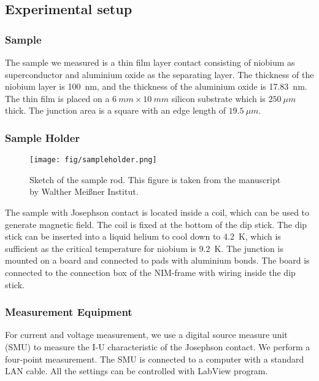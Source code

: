 \subsection{Experimental setup}

\subsubsection{Sample}
The sample we measured is a thin film layer contact consisting of niobium as superconductor and aluminium oxide as the separating layer. The thickness of the niobium layer is \SI{100}{nm}, and the thickness of the aluminium oxide is \SI{17.83}{nm}. The thin film is placed on a $\SI{6}{mm} \times \SI{10}{mm}$ silicon substrate which is $\SI{250}{\mu m}$ thick. The junction area is a square with an edge length of $\SI{19.5}{\mu m}$.

\subsubsection{Sample Holder}

\begin{figure}

\centering
\texttt{[image: fig/sampleholder.png]}

\caption{Sketch of the sample rod. This figure is taken from the manuscript by Walther Meißner Institut.}

\label{sampleholder}
\end{figure}

The sample with Josephson contact is located inside a coil, which can be used to generate magnetic field. The coil is fixed at the bottom of the dip stick. The dip stick can be inserted into a liquid helium to cool down to \SI{4.2}{K}, which is sufficient as the critical temperature for niobium is \SI{9.2}{K}. The junction is mounted on a board and connected to pads with aluminium bonds. The board is connected to the connection box of the NIM-frame with wiring inside the dip stick.

\subsubsection{Measurement Equipment}
For current and voltage measurement, we use a digital source measure unit (SMU) to measure the I-U characteristic of the Josephson contact. We perform a four-point measurement. The SMU is connected to a computer with a standard LAN cable. All the settings can be controlled with LabView program.

